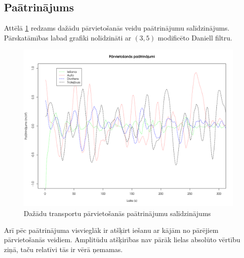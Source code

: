 \documentclass{ludis}
\begin{document}
\subsection{Paātrinājums}
Attēlā \ref{fig:acceleration_comparison} redzams dažādu pārvietošanās veidu paātrinājumu 
salīdzinājums. Pārskatāmības labad grafiki nolīdzināti ar $(3, 5)$ modificēto Daniell filtru.

\begin{figure}
  \centering
  \includegraphics[scale=0.5]{img/acceleration_comparison}
  \caption{Dažādu transportu pārvietošanās paātrinājumu salīdzinājums}
  \label{fig:acceleration_comparison}
\end{figure}

Arī pēc paātrinājuma visvieglāk ir atšķirt iešanu ar kājām no pārējiem pārvietošanās veidiem. 
Amplitūdu atšķirības nav pārāk lielas absolūto vērtību ziņā, taču relatīvi tās ir vērā ņemamas.
\end{document}
